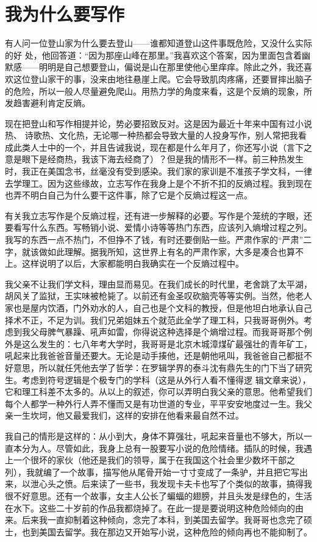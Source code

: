 \chapter{我为什么要写作}

有人问一位登山家为什么要去登山——谁都知道登山这件事既危险，又没什么实际的好 处，他回答道：“因为那座山峰在那里。”我喜欢这个答案，因为里面包含着幽默感——明明是自己想要登山，偏说是山在那里使他心里痒痒。除此之外，我还喜欢这位登山家干的事，没来由地往悬崖上爬。它会导致肌肉疼痛，还要冒摔出脑子的危险，所以一般人尽量避免爬山。用热力学的角度来看，这是个反熵的现象，所发趋害避利肯定反熵。 

现在把登山和写作相提并论，势必要招致反对。这是因为最近十年来中国有过小说热、 诗歌热、文化热，无论哪一种热都会导致大量的人投身写作，别人常把我看成此类人士中的一个，并且告诫我说，现在都是什么年月了，你还写小说（言下之意是眼下是经商热，我该下海去经商了）？但是我的情形不一样。前三种热发生时，我正在美国念书，丝毫没有受到感染。我们家的家训是不准孩子学文科，一律去学理工。因为这些缘故，立志写作在我身上是个不折不扣的反熵过程。我到现在也弄不明白自己为什么要干这件事，除了它是个反熵过程这一点。 

有关我立志写作是个反熵过程，还有进一步解释的必要。写作是个笼统的字眼，还要看写什么东西。写畅销小说、爱情小诗等等热门东西，应该列入熵增过程之列。我写的东西一点不热门，不但挣不了钱，有时还要倒贴一些。严肃作家的“严肃”二字，就该做如此理解。据我所知，这世界上有名的严肃作家，大多是凑合也算不上。这样说明了以后，大家都能明白我确实在一个反熵过程中。 

我父亲不让我们学文科，理由显而易见。在我们成长的时代里，老舍跳了太平湖，胡风关了监狱，王实味被枪毙了。以前还有金圣叹砍脑壳等等实例。当然，他老人家也是屋内饮酒，门外劝水的人，自己也是个文科的教授，但是他坦白地承认自己择术不正，不足为训。我们兄弟姐妹五个就范此全学了理工科，只我哥哥例外。考虑到我父母脾气暴躁、吼声如雷，你得说这种选择是个熵增过程。而我哥哥那个例外是这么发生的：七八年考大学时，我哥哥是北京木城漳煤矿最强壮的青年矿工，吼起来比我爸爸音量还要大。无论是动手揍他，还是朝他吼叫，我爸爸自己都挺不好意思，所以就任凭他去学了哲学：在罗辑学界的泰斗沈有鼎先生的门下当了研究生。考虑到符号逻辑是个极专门的学科（这是从外行人看不懂得逻 辑文章来说），它和理工科差不太多的。从以上的叙述，你可以弄明白我父亲的意思。他希望我们每个人都学一种外行人弄不懂而又是有功世道的专业，平平安安地度过一生。我父亲一生坎坷，他又最爱我们，这样的安排在他看来最自然不过。 

我自己的情形是这样的：从小到大，身体不算强壮，吼起来音量也不够大，所以一直本分为人。尽管如此，我身上总有一股要写小说的危险情绪。插队的时候，我遇上一个很坏的家伙（他还是我们的领导，属于在我国这个社会里少数坏干部之列），我就编了一个故事，描写他从尾骨开始一寸寸变成了一条驴，并且把它写出来，以泄心头之愤。后来读了一些书，我发现卡夫卡也写了个类似的故事，搞得我很不好意思。还有一个故事，女主人公长了蝙蝠的翅膀，并且头发是绿色的，生活在水下。这些二十岁前的作品我都烧掉了。在此一提是要说明这种危险倾向的由来。后来我一直抑制着这种倾向，念完了本科，到美国去留学。我哥哥也念完了硕士，也到美国去留学。我在那边又开始写小说，这种危险的倾向再也不能抑制了。 

